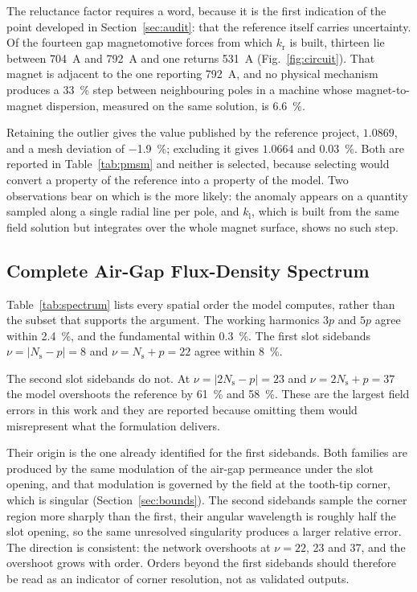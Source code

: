 \documentclass[10pt,a4paper,twocolumn]{article}
\theoremstyle{plain}
\theoremstyle{remark}
\begin{document}
The reluctance factor requires a word, because it is the first
indication of the point developed in Section~\ref{sec:audit}: that the
reference itself carries uncertainty. Of the fourteen gap magnetomotive
forces from which $k_{\mathrm{r}}$ is built, thirteen lie between
\SI{704}{\ampere} and \SI{792}{\ampere} and one returns
\SI{531}{\ampere} (Fig.~\ref{fig:circuit}). That magnet is adjacent to
the one reporting \SI{792}{\ampere}, and no physical mechanism produces
a \SI{33}{\percent} step between neighbouring poles in a machine whose
magnet-to-magnet dispersion, measured on the same solution, is
\SI{6.6}{\percent}.

Retaining the outlier gives the value published by the reference
project, $1.0869$, and a mesh deviation of \SI{-1.9}{\percent};
excluding it gives $1.0664$ and \SI{+0.03}{\percent}. Both are reported
in Table~\ref{tab:pmsm} and neither is selected, because selecting would
convert a property of the reference into a property of the model. Two
observations bear on which is the more likely: the anomaly appears on a
quantity sampled along a single radial line per pole, and
$k_{\mathrm{l}}$, which is built from the same field solution but
integrates over the whole magnet surface, shows no such step.

\subsection{Complete Air-Gap Flux-Density Spectrum}
\label{sub:spectrum}

Table~\ref{tab:spectrum} lists every spatial order the model computes,
rather than the subset that supports the argument. The working harmonics
$3p$ and $5p$ agree within \SI{2.4}{\percent}, and the fundamental
within \SI{0.3}{\percent}. The first slot sidebands
$\nu=|N_{\mathrm{s}}-p|=8$ and $\nu=N_{\mathrm{s}}+p=22$ agree within
\SI{8}{\percent}.

The second slot sidebands do not. At $\nu=|2N_{\mathrm{s}}-p|=23$ and
$\nu=2N_{\mathrm{s}}+p=37$ the model overshoots the reference by
\SI{61}{\percent} and \SI{58}{\percent}. These are the largest field
errors in this work and they are reported because omitting them would
misrepresent what the formulation delivers.

Their origin is the one already identified for the first sidebands. Both
families are produced by the same modulation of the air-gap permeance
under the slot opening, and that modulation is governed by the field at
the tooth-tip corner, which is singular (Section~\ref{sec:bounds}). The
second sidebands sample the corner region more sharply than the
first, their angular wavelength is roughly half the slot opening, so
the same unresolved singularity produces a larger relative error. The
direction is consistent: the network overshoots at $\nu=22$, 23 and 37,
and the overshoot grows with order. Orders beyond the first sidebands
should therefore be read as an indicator of corner resolution, not as
validated outputs.
\end{document}
